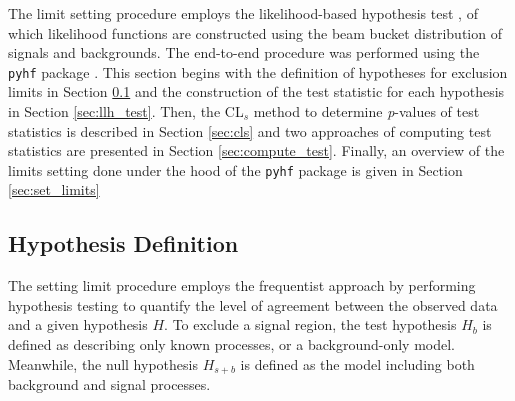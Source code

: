 The limit setting procedure employs the likelihood-based hypothesis test \cite{asymptotic_test}, of which likelihood functions are constructed using the beam bucket distribution of signals and backgrounds.
The end-to-end procedure was performed using the \texttt{pyhf} package \cite{pyhf, pyhf_joss}.
This section begins with the definition of hypotheses for exclusion limits in Section \ref{sec:hypothesis_def} and the construction of the test statistic for each hypothesis in Section \ref{sec:llh_test}.
Then, the CL$_{s}$ method to determine \textit{p}-values of test statistics is described in Section \ref{sec:cls} and two approaches of computing test statistics are presented in Section \ref{sec:compute_test}. 
Finally, an overview of the limits setting done under the hood of the \texttt{pyhf} package is given in Section \ref{sec:set_limits} 




\subsection{Hypothesis Definition}
\label{sec:hypothesis_def}
The setting limit procedure employs the frequentist approach by performing hypothesis testing to quantify the level of agreement between the observed data and a given hypothesis $H$.
To exclude a signal region, the test hypothesis $H_{b}$ is defined as describing only known processes, or a background-only model.
Meanwhile, the null hypothesis $H_{s+b}$ is defined as the model including both background and signal processes.

